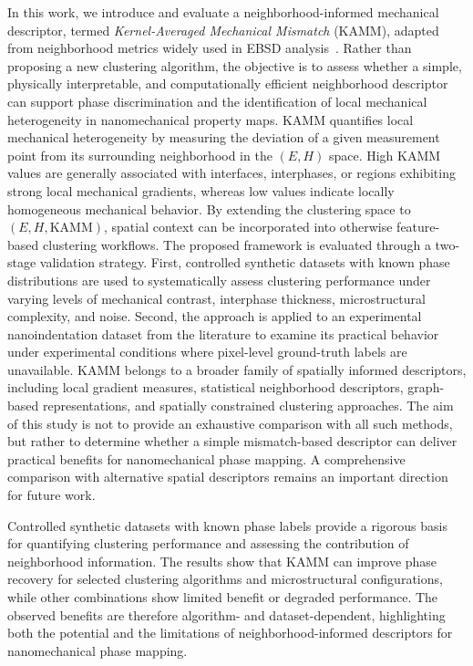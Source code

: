 \documentclass[final,3p,times]{elsarticle}
\begin{document}
In this work, we introduce and evaluate a neighborhood-informed mechanical descriptor, termed \textit{Kernel-Averaged Mechanical Mismatch} (KAMM), adapted from neighborhood metrics widely used in EBSD analysis~\cite{parish_cluster_2022,mtex_kam}. Rather than proposing a new clustering algorithm, the objective is to assess whether a simple, physically interpretable, and computationally efficient neighborhood descriptor can support phase discrimination and the identification of local mechanical heterogeneity in nanomechanical property maps. KAMM quantifies local mechanical heterogeneity by measuring the deviation of a given measurement point from its surrounding neighborhood in the $(E,H)$ space. High KAMM values are generally associated with interfaces, interphases, or regions exhibiting strong local mechanical gradients, whereas low values indicate locally homogeneous mechanical behavior. By extending the clustering space to $(E,H,\mathrm{KAMM})$, spatial context can be incorporated into otherwise feature-based clustering workflows. The proposed framework is evaluated through a two-stage validation strategy. First, controlled synthetic datasets with known phase distributions are used to systematically assess clustering performance under varying levels of mechanical contrast, interphase thickness, microstructural complexity, and noise. Second, the approach is applied to an experimental nanoindentation dataset from the literature to examine its practical behavior under experimental conditions where pixel-level ground-truth labels are unavailable. KAMM belongs to a broader family of spatially informed descriptors, including local gradient measures, statistical neighborhood descriptors, graph-based representations, and spatially constrained clustering approaches. The aim of this study is not to provide an exhaustive comparison with all such methods, but rather to determine whether a simple mismatch-based descriptor can deliver practical benefits for nanomechanical phase mapping. A comprehensive comparison with alternative spatial descriptors remains an important direction for future work.

Controlled synthetic datasets with known phase labels provide a rigorous basis for quantifying clustering performance and assessing the contribution of neighborhood information. The results show that KAMM can improve phase recovery for selected clustering algorithms and microstructural configurations, while other combinations show limited benefit or degraded performance. The observed benefits are therefore algorithm- and dataset-dependent, highlighting both the potential and the limitations of neighborhood-informed descriptors for nanomechanical phase mapping.
\end{document}
